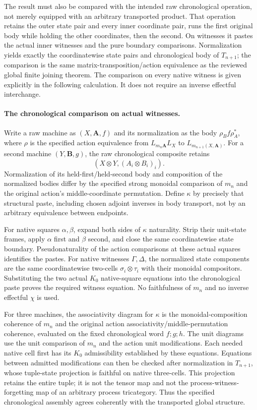 \documentclass{article}
\begin{document}
The result must also be compared with the intended raw chronological operation, not merely equipped with an arbitrary transported product. That operation retains the outer state pair and every inner coordinate pair, runs the first original body while holding the other coordinates, then the second. On witnesses it pastes the actual inner witnesses and the pure boundary comparisons. Normalization yields exactly the coordinatewise state pairs and chronological body of $T_{n+1}$; the comparison is the same matrix-transposition/action equivalence as the reviewed global finite joining theorem. The comparison on every native witness is given explicitly in the following calculation. It does not require an inverse effectful interchange.

\paragraph{The chronological comparison on actual witnesses.} Write a raw machine as $(X,\mathbf A,f)$ and its normalization as the body $\rho_B f\rho_A^*$, where $\rho$ is the specified action equivalence from $L_{m_n\mathbf A}L_X$ to $L_{m_{n+1}(X,\mathbf A)}$. For a second machine $(Y,\mathbf B,g)$, the raw chronological composite retains
\[
 (X\otimes Y,(A_i\otimes B_i)_i).
\]
Normalization of its held-first/held-second body and composition of the normalized bodies differ by the specified strong monoidal comparison of $m_n$ and the original action's middle-coordinate permutation. Define $\kappa$ by precisely that structural paste, including chosen adjoint inverses in body transport, not by an arbitrary equivalence between endpoints.

For native squares $\alpha,\beta$, expand both sides of $\kappa$ naturality. Strip their unit-state frames, apply $\alpha$ first and $\beta$ second, and close the same coordinatewise state boundary. Pseudonaturality of the action comparisons at these actual squares identifies the pastes. For native witnesses $\Gamma,\Delta$, the normalized state components are the same coordinatewise two-cells $\sigma_i\otimes\tau_i$ with their monoidal compositors. Substituting the two actual $K_0$ native-square equations into the chronological paste proves the required witness equation. No faithfulness of $m_n$ and no inverse effectful $\chi$ is used.

For three machines, the associativity diagram for $\kappa$ is the monoidal-composition coherence of $m_n$ and the original action associativity/middle-permutation coherence, evaluated on the fixed chronological word $f;g;h$. The unit diagrams use the unit comparison of $m_n$ and the action unit modifications. Each needed native cell first has its $K_0$ admissibility established by these equations. Equations between admitted modifications can then be checked after normalization in $T_{n+1}$, whose tuple-state projection is faithful on native three-cells. This projection retains the entire tuple; it is not the tensor map and not the process-witness-forgetting map of an arbitrary process tricategory. Thus the specified chronological assembly agrees coherently with the transported global structure.
\end{document}
